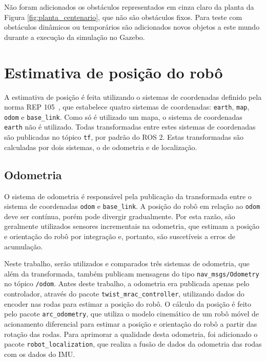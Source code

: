 \documentclass[repeatfields,xlists,xpacks,oneside,yearsonly]{ufrgscca}
\begin{document}
Não foram adicionados os obstáculos representados em cinza claro da
planta da Figura \ref{fig:planta_centenario}, que não são obstáculos
fixos. Para teste com obstáculos dinâmicos ou temporários são
adicionados novos objetos a este mundo durante a execução da
simulação no Gazebo.

\section{Estimativa de posição do robô}

A estimativa de posição é feita utilizando o sistemas de coordenadas
definido pela norma REP 105~\cite{rep_105}, que estabelece quatro
sistemas de coordenadas: \texttt{earth}, \texttt{map}, \texttt{odom}
e \texttt{base\_link}. Como só é utilizado um mapa, o sistema de
coordenadas \texttt{earth} não é utilizado. Todas transformadas entre
estes sistemas de coordenadas são publicadas no tópico \texttt{tf},
por padrão do ROS 2. Estas transformadas são calculadas por dois
sistemas, o de odometria e de localização.

\subsection{Odometria}
\label{met:odometria}

O sistema de odometria é responsável pela publicação da transformada
entre o sistema de coordenadas \texttt{odom} e \texttt{base\_link}. A
posição do robô em relação ao \texttt{odom} deve ser contínua, porém
pode divergir gradualmente. Por esta razão, são geralmente utilizados
sensores incrementais na odometria, que estimam a posição e
orientação do robô por integração e, portanto, são suscetíveis a
erros de acumulação. 

Neste trabalho, serão utilizados e comparados três sistemas de
odometria, que além da transformada, também publicam mensagens do
tipo \texttt{nav\_msgs/Odometry} no tópico \texttt{/odom}. Antes
deste trabalho, a odometria era publicada apenas pelo controlador,
através do pacote \texttt{twist\_mrac\_controller}, utilizando dados
do encoder nas rodas para estimar a posição do robô. O cálculo da
posição é feito pelo pacote \texttt{arc\_odometry}, que utiliza o
modelo cinemático de um robô móvel de acionamento diferencial para
estimar a posição e orientação do robô a partir das rotação das
rodas. Para aprimorar a qualidade desta odometria, foi adicionado o
pacote \texttt{robot\_localization}, que realiza a fusão de dados da
odometria das rodas com os dados do IMU.
\end{document}
